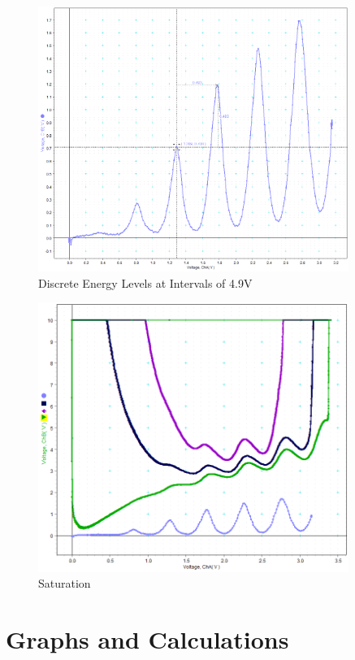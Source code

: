 \documentclass{amsart}
\begin{document}
\begin{figure}[H]
\includegraphics[width=0.9\textwidth]{graph.png}
\caption{Discrete Energy Levels at Intervals of 4.9V}
\end{figure}

\begin{figure}[H]
\includegraphics[width=0.9\textwidth]{saturation.png}
\caption{Saturation}
\end{figure}

\medskip

\pagebreak


\section{Graphs and Calculations}
\end{document}
